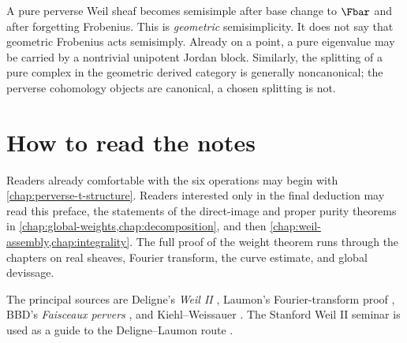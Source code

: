 A pure perverse Weil sheaf becomes semisimple after base change to
\(\Fbar\) and after forgetting Frobenius.  This is \emph{geometric}
semisimplicity.  It does not say that geometric Frobenius acts semisimply.
Already on a point, a pure eigenvalue may be carried by a nontrivial unipotent
Jordan block.  Similarly, the splitting of a pure complex in the geometric
derived category is generally noncanonical; the perverse cohomology objects
are canonical, a chosen splitting is not.

\section*{How to read the notes}

Readers already comfortable with the six operations may begin with
\cref{chap:perverse-t-structure}.  Readers interested only in the final
deduction may read this preface, the statements of the direct-image and proper
purity theorems in \cref{chap:global-weights,chap:decomposition}, and then
\cref{chap:weil-assembly,chap:integrality}.  The full proof of the weight
theorem runs through the chapters on real sheaves, Fourier transform, the
curve estimate, and global devissage.

The principal sources are Deligne's \emph{Weil II}
\cite{DeligneWeilII}, Laumon's Fourier-transform proof
\cite{LaumonFourier}, BBD's \emph{Faisceaux pervers} \cite{BBD}, and
Kiehl--Weissauer \cite{KiehlWeissauer}.  The Stanford Weil II seminar is used
as a guide to the Deligne--Laumon route \cite{StanfordWeilIISeminar}.
